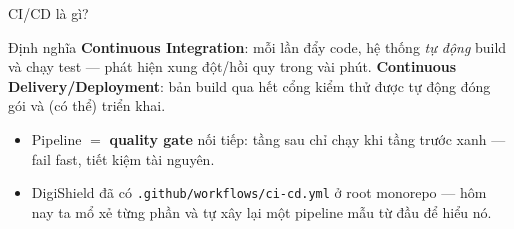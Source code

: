 \documentclass[aspectratio=169,12pt]{beamer}
\begin{document}
\begin{frame}{CI/CD là gì?}
  \begin{block}{Định nghĩa}
    \textbf{Continuous Integration}: mỗi lần đẩy code, hệ thống \emph{tự động} build và chạy test --- phát hiện xung đột/hồi quy trong vài phút.
    \textbf{Continuous Delivery/Deployment}: bản build qua hết cổng kiểm thử được tự động đóng gói và (có thể) triển khai.
  \end{block}
  \begin{center}
  \end{center}
  \begin{itemize}
    \item Pipeline $=$ \textbf{quality gate} nối tiếp: tầng sau chỉ chạy khi tầng trước xanh --- fail fast, tiết kiệm tài nguyên.
    \item DigiShield \alert{đã có} \texttt{.github/workflows/ci-cd.yml} ở root monorepo --- hôm nay ta mổ xẻ từng phần và tự xây lại một pipeline mẫu từ đầu để hiểu nó.
  \end{itemize}
\end{frame}
\end{document}
